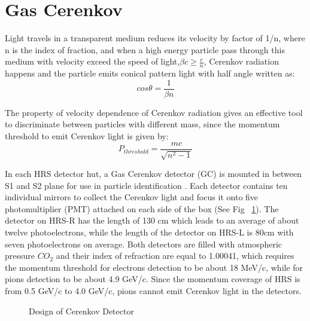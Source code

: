 \section{Gas Cerenkov}
 Light travels in a transparent medium reduces its velocity by factor of 1/n, where n is the index of fraction, and when a high energy particle pass through this medium with velocity exceed the speed of light,$\beta c \geq \frac{c}{n}$, Cerenkov radiation happens and the particle emits conical pattern light with half angle written as:
\begin{equation}
 cos \theta = \frac{1}{\beta n}
\end{equation}

 The property of velocity dependence of Cerenkov radiation gives an effective tool to discriminate between particles with different mass, since the momentum threshold to emit Cerenkov light is given by:
\begin{equation}
 P_{threshold} = \frac{mc}{\sqrt{n^{2}-1}}
\end{equation}


 In each HRS detector hut, a Gas Cerenkov detector (GC) is mounted in between S1 and S2 plane for use in particle identification \cite{halla_nim}. Each detector contains ten individual mirrors to collect the Cerenkov light and focus it onto five photomultiplier (PMT) attached on each side of the box (See Fig ~\ref{gc_pmt}). The detector on HRS-R has the length of 130 cm which leads to an average of about twelve photoelectrons, while the length of the detector on HRS-L is 80cm with seven photoelectrons on average. Both detectors are filled with atmospheric pressure $CO_{2}$ and their index of refraction are equal to 1.00041, which requires the momentum threshold for electrons detection to be about 18 MeV/c, while for pions detection to be about 4.9 GeV/c. Since the momentum coverage of HRS is from 0.5 GeV/c to 4.0 GeV/c, pions cannot emit Cerenkov light in the detectors.

\begin{figure}[htb]
\centerline{}
\caption[Design of Cerenkov Detector]{\footnotesize{Design of Cerenkov Detector}
\label{gc_pmt}}
\end{figure}

\clearpage


